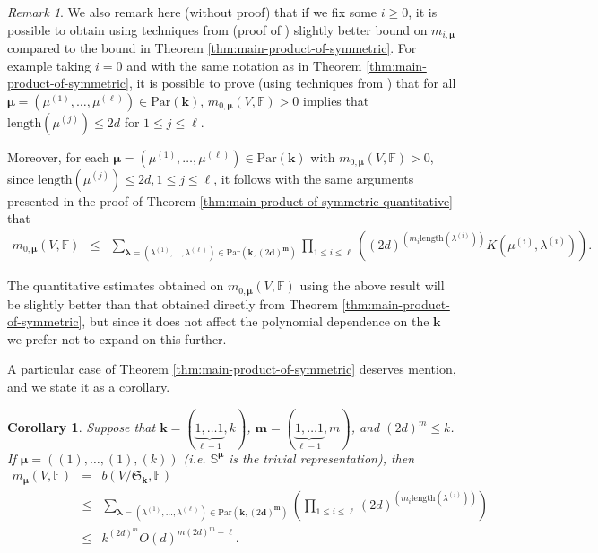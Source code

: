 \documentclass{amsart}
\newtheorem{corollary}{Corollary}
\theoremstyle{definition}
\theoremstyle{remark}
\newtheorem{remark}{Remark}
\numberwithin{equation}{section}
\begin{document}
\begin{remark}
\label{rem:b0}
We also remark here (without proof)  that if we fix some $i \geq 0$,
it is possible to  obtain 
using techniques from \cite{BC2013} (proof of \cite[Proposition 8]{BC2013})
slightly better bound on  $m_{i,\pmb{\mu}}$ compared
to the bound in Theorem \ref{thm:main-product-of-symmetric}. 
For example taking $i=0$ and with the same notation as in Theorem \ref{thm:main-product-of-symmetric}, 
it is possible to prove (using techniques from \cite{BC2013})  that
for all $\pmb{\mu} =(\mu^{(1)},\ldots,\mu^{(\ell)}) \in {\mathrm{Par}}({\mathbf{k}})$,  $m_{0,\pmb{\mu}}(V,{\mathbb{F}}) > 0$ implies that
${\mathrm{length}}(\mu^{(j)}) \leq 2d$ for $1 \leq j \leq \ell$.

Moreover, for each  $\pmb{\mu} =(\mu^{(1)},\ldots,\mu^{(\ell)}) \in {\mathrm{Par}}({\mathbf{k}})  $ with $m_{0,\pmb{\mu}}(V,{\mathbb{F}}) > 0$,
since ${\mathrm{length}}(\mu^{(j)})\leq 2d, 1 \leq j \leq \ell$, 
it follows with the same arguments  presented in the proof of 
Theorem \ref{thm:main-product-of-symmetric-quantitative} that
\begin{eqnarray*}
  m_{0,\pmb{\mu}}(V,{\mathbb{F}}) &\leq& 
\sum_{\pmb{\lambda}=(\lambda^{(1)},\ldots,\lambda^{(\ell)})\in {\mathrm{Par}}({\mathbf{k}}, (2{\mathbf{d}})^{\mathbf{m}})}
\prod_{1 \leq i \leq \ell}
\left(
 (2 d)^{(m_i{\mathrm{length}}(\lambda^{(i)}))}
 K(\mu^{(i)},\lambda^{(i)})
 \right).
\end{eqnarray*}

The quantitative estimates obtained on $m_{0,\pmb{\mu}}(V,{\mathbb{F}})$ using the above result will
be slightly better than that obtained directly from Theorem \ref{thm:main-product-of-symmetric}, but since it does not affect the polynomial dependence on the ${\mathbf{k}}$ we prefer 
not to expand on this further.
\end{remark}

A particular case of Theorem \ref{thm:main-product-of-symmetric} deserves mention, and
we state it as a corollary.
\begin{corollary}
\label{cor:equivariant} 
Suppose that
$\mathbf{k}= (\underbrace{1, \ldots 1}_{\ell-1} ,k)$, 
$\mathbf{m}= (\underbrace{1, \ldots 1}_{\ell-1} ,m)$, 
and $(2d)^m \leq k$.
If $\pmb{\mu} = ((1),\ldots,(1),(k))$ (i.e.  $\mathbb{S}^{\pmb{\mu}}$ is the trivial representation),
then
\begin{eqnarray*}
 m_{\pmb{\mu}}(V,{\mathbb{F}}) &=&  b(V/\mathfrak{S}_{\mathbf{k}},{\mathbb{F}})  \\
 &\leq& \sum_{\pmb{\lambda}=(\lambda^{(1)},\ldots,\lambda^{(\ell)})\in {\mathrm{Par}}({\mathbf{k}},(2{\mathbf{d}})^{\mathbf{m}})} 
 \left(\prod_{1 \leq i \leq \ell}   
 (2 d)^{(m_i{\mathrm{length}}(\lambda^{(i)}))}
 \right) \\
 &\leq & k^{(2d)^{m}} O(d)^{m (2d)^m + \ell}.
 \end{eqnarray*}
\end{corollary}
\end{document}
